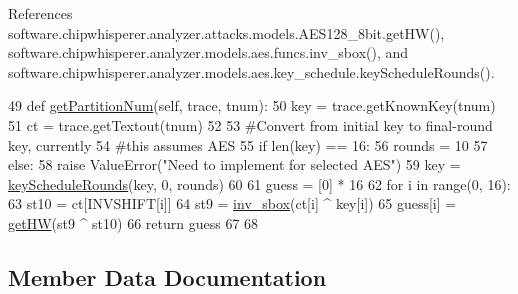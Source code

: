 References software.\+chipwhisperer.\+analyzer.\+attacks.\+models.\+A\+E\+S128\+\_\+8bit.\+get\+H\+W(), software.\+chipwhisperer.\+analyzer.\+models.\+aes.\+funcs.\+inv\+\_\+sbox(), and software.\+chipwhisperer.\+analyzer.\+models.\+aes.\+key\+\_\+schedule.\+key\+Schedule\+Rounds().


\begin{DoxyCode}
49     \textcolor{keyword}{def }\hyperlink{classsoftware_1_1chipwhisperer_1_1analyzer_1_1utils_1_1Partition_1_1PartitionHDLastRound_a425b9b2390ba878dd1c8dfd65897be57}{getPartitionNum}(self, trace, tnum):
50         key = trace.getKnownKey(tnum)
51         ct = trace.getTextout(tnum)
52 
53         \textcolor{comment}{#Convert from initial key to final-round key, currently}
54         \textcolor{comment}{#this assumes AES}
55         \textcolor{keywordflow}{if} len(key) == 16:
56             rounds = 10
57         \textcolor{keywordflow}{else}:
58             \textcolor{keywordflow}{raise} ValueError(\textcolor{stringliteral}{"Need to implement for selected AES"})
59         key = \hyperlink{namespacesoftware_1_1chipwhisperer_1_1analyzer_1_1models_1_1aes_1_1key__schedule_aa0e0cef2bfba47599cd9fdaed40e4c5c}{keyScheduleRounds}(key, 0, rounds)
60 
61         guess = [0] * 16
62         \textcolor{keywordflow}{for} i \textcolor{keywordflow}{in} range(0, 16):
63             st10 = ct[INVSHIFT[i]]
64             st9 = \hyperlink{namespacesoftware_1_1chipwhisperer_1_1analyzer_1_1models_1_1aes_1_1funcs_abd974ec608fb9868e7bed0e11facf526}{inv\_sbox}(ct[i] ^ key[i])
65             guess[i] = \hyperlink{namespacesoftware_1_1chipwhisperer_1_1analyzer_1_1attacks_1_1models_1_1AES128__8bit_ad7e775a7bb3510f159149dba221c7732}{getHW}(st9 ^ st10)
66         \textcolor{keywordflow}{return} guess
67 
68 
\end{DoxyCode}


\subsection{Member Data Documentation}
\hypertarget{classsoftware_1_1chipwhisperer_1_1analyzer_1_1utils_1_1Partition_1_1PartitionHDLastRound_ae335e15aa1d255853295367496c7d664}{}
